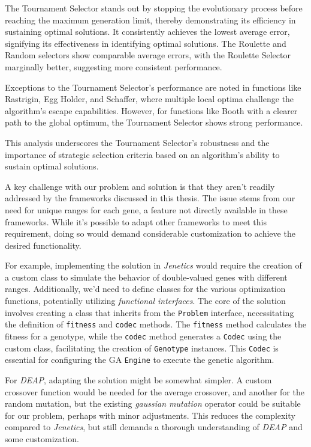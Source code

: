     The Tournament Selector stands out by stopping the evolutionary process before reaching the maximum generation 
    limit, thereby demonstrating its efficiency in sustaining optimal solutions. It consistently achieves the lowest 
    average error, signifying its effectiveness in identifying optimal solutions. The Roulette and Random selectors 
    show comparable average errors, with the Roulette Selector marginally better, suggesting more consistent 
    performance.
    
    Exceptions to the Tournament Selector's performance are noted in functions like Rastrigin, Egg Holder, and 
    Schaffer, where multiple local optima challenge the algorithm's escape capabilities. However, for functions like 
    Booth with a clearer path to the global optimum, the Tournament Selector shows strong performance.

    This analysis underscores the Tournament Selector's robustness and the importance of strategic selection criteria 
    based on an algorithm's ability to sustain optimal solutions.

    A key challenge with our problem and solution is that they aren't readily addressed by the frameworks discussed 
    in this thesis. The issue stems from our need for unique ranges for each gene, a feature not directly available 
    in these frameworks. While it's possible to adapt other frameworks to meet this requirement, doing so would 
    demand considerable customization to achieve the desired functionality.

    For example, implementing the solution in \textit{Jenetics} would require the creation of a custom class to
    simulate the behavior of double-valued genes with different ranges. Additionally, we'd need to define classes 
    for the various optimization functions, potentially utilizing \textit{functional interfaces}. The core of the 
    solution involves creating a class that inherits from the \texttt{Problem} interface, necessitating the 
    definition of \texttt{fitness} and \texttt{codec} methods. The \texttt{fitness} method calculates the fitness 
    for a genotype, while the \texttt{codec} method generates a \texttt{Codec} using the custom class, facilitating 
    the creation of \texttt{Genotype} instances. This \texttt{Codec} is essential for configuring the GA 
    \texttt{Engine} to execute the genetic algorithm.

    For \textit{DEAP}, adapting the solution might be somewhat simpler. A custom crossover function would be needed 
    for the average crossover, and another for the random mutation, but the existing \textit{gaussian mutation} 
    operator could be suitable for our problem, perhaps with minor adjustments. This reduces the complexity 
    compared to \textit{Jenetics}, but still demands a thorough understanding of \textit{DEAP} and some 
    customization.

